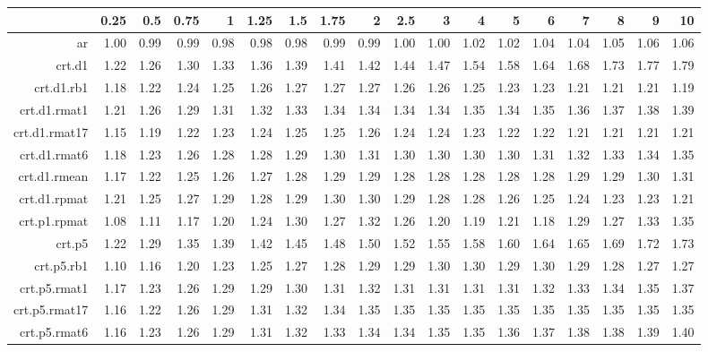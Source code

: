 \begin{tabular}{rrrrrrrrrrrrrrrrrr}
  \hline
 & 0.25 & 0.5 & 0.75 & 1 & 1.25 & 1.5 & 1.75 & 2 & 2.5 & 3 & 4 & 5 & 6 & 7 & 8 & 9 & 10 \\ 
  \hline
ar & 1.00 & 0.99 & 0.99 & 0.98 & 0.98 & 0.98 & 0.99 & 0.99 & 1.00 & 1.00 & 1.02 & 1.02 & 1.04 & 1.04 & 1.05 & 1.06 & 1.06 \\ 
  crt.d1 & 1.22 & 1.26 & 1.30 & 1.33 & 1.36 & 1.39 & 1.41 & 1.42 & 1.44 & 1.47 & 1.54 & 1.58 & 1.64 & 1.68 & 1.73 & 1.77 & 1.79 \\ 
  crt.d1.rb1 & 1.18 & 1.22 & 1.24 & 1.25 & 1.26 & 1.27 & 1.27 & 1.27 & 1.26 & 1.26 & 1.25 & 1.23 & 1.23 & 1.21 & 1.21 & 1.21 & 1.19 \\ 
  crt.d1.rmat1 & 1.21 & 1.26 & 1.29 & 1.31 & 1.32 & 1.33 & 1.34 & 1.34 & 1.34 & 1.34 & 1.35 & 1.34 & 1.35 & 1.36 & 1.37 & 1.38 & 1.39 \\ 
  crt.d1.rmat17 & 1.15 & 1.19 & 1.22 & 1.23 & 1.24 & 1.25 & 1.25 & 1.26 & 1.24 & 1.24 & 1.23 & 1.22 & 1.22 & 1.21 & 1.21 & 1.21 & 1.21 \\ 
  crt.d1.rmat6 & 1.18 & 1.23 & 1.26 & 1.28 & 1.28 & 1.29 & 1.30 & 1.31 & 1.30 & 1.30 & 1.30 & 1.30 & 1.31 & 1.32 & 1.33 & 1.34 & 1.35 \\ 
  crt.d1.rmean & 1.17 & 1.22 & 1.25 & 1.26 & 1.27 & 1.28 & 1.29 & 1.29 & 1.28 & 1.28 & 1.28 & 1.28 & 1.28 & 1.29 & 1.29 & 1.30 & 1.31 \\ 
  crt.d1.rpmat & 1.21 & 1.25 & 1.27 & 1.29 & 1.28 & 1.29 & 1.30 & 1.30 & 1.29 & 1.28 & 1.28 & 1.26 & 1.25 & 1.24 & 1.23 & 1.23 & 1.21 \\ 
  crt.p1.rpmat & 1.08 & 1.11 & 1.17 & 1.20 & 1.24 & 1.30 & 1.27 & 1.32 & 1.26 & 1.20 & 1.19 & 1.21 & 1.18 & 1.29 & 1.27 & 1.33 & 1.35 \\ 
  crt.p5 & 1.22 & 1.29 & 1.35 & 1.39 & 1.42 & 1.45 & 1.48 & 1.50 & 1.52 & 1.55 & 1.58 & 1.60 & 1.64 & 1.65 & 1.69 & 1.72 & 1.73 \\ 
  crt.p5.rb1 & 1.10 & 1.16 & 1.20 & 1.23 & 1.25 & 1.27 & 1.28 & 1.29 & 1.29 & 1.30 & 1.30 & 1.29 & 1.30 & 1.29 & 1.28 & 1.27 & 1.27 \\ 
  crt.p5.rmat1 & 1.17 & 1.23 & 1.26 & 1.29 & 1.29 & 1.30 & 1.31 & 1.32 & 1.31 & 1.31 & 1.31 & 1.31 & 1.32 & 1.33 & 1.34 & 1.35 & 1.37 \\ 
  crt.p5.rmat17 & 1.16 & 1.22 & 1.26 & 1.29 & 1.31 & 1.32 & 1.34 & 1.35 & 1.35 & 1.35 & 1.35 & 1.35 & 1.35 & 1.35 & 1.35 & 1.35 & 1.35 \\ 
  crt.p5.rmat6 & 1.16 & 1.23 & 1.26 & 1.29 & 1.31 & 1.32 & 1.33 & 1.34 & 1.34 & 1.35 & 1.35 & 1.36 & 1.37 & 1.38 & 1.38 & 1.39 & 1.40 \\ 

\end{tabular}

